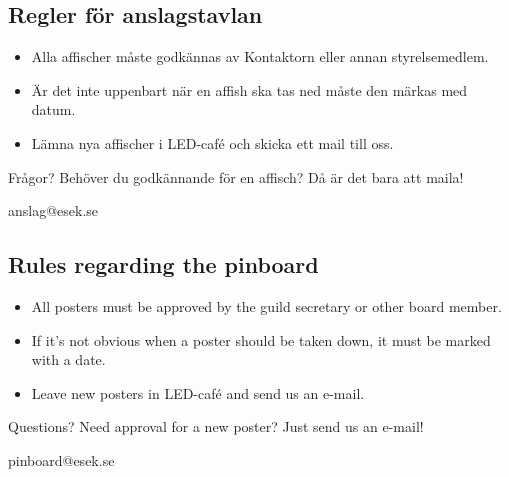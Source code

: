 \documentclass{article}
\begin{document}
    \subsection*{Regler för anslagstavlan}
    \begin{itemize}[label={--\ }, topsep=0mm, itemsep=0mm]
        \item Alla affischer måste godkännas av Kontaktorn eller annan styrelsemedlem.
        \item Är det inte uppenbart när en affish ska tas ned måste den märkas med datum.
        \item Lämna nya affischer i LED-café och skicka ett mail till oss.
    \end{itemize}

    Frågor? Behöver du godkännande för en affisch? Då är det bara att maila!

    anslag@esek.se

    \vspace{3mm}

    \subsection*{Rules regarding the pinboard}
    \begin{itemize}[label={--\ }, topsep=0mm, itemsep=0mm]
        \item All posters must be approved by the guild secretary or other board member.
        \item If it's not obvious when a poster should be taken down, it must be marked with a date.
        \item Leave new posters in LED-café and send us an e-mail.
    \end{itemize}

    Questions? Need approval for a new poster? Just send us an e-mail!

    pinboard@esek.se
\end{document}
